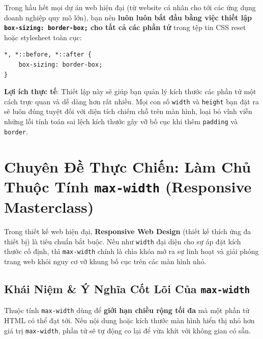 \documentclass[11pt,oneside]{book}
\newcommand{\codeinline}[1]{\textcolor{accentOrange}{\texttt{#1}}}
\newcommand{\term}[1]{\textbf{\textcolor{primaryBlue}{#1}}}
\DeclareRobustCommand{\csshint}[1]{\texorpdfstring{\textcolor{accentOrange}{\textbf{\texttt{#1}}}}{#1}}
\begin{document}
\begin{tipBox}
Trong hầu hết mọi dự án web hiện đại (từ website cá nhân cho tới các ứng dụng doanh nghiệp quy mô lớn), bạn nên \textbf{luôn luôn bắt đầu bằng việc thiết lập \codeinline{box-sizing: border-box;} cho tất cả các phần tử} trong tệp tin CSS reset hoặc stylesheet toàn cục:

\begin{lstlisting}[language=CSS3]
*, *::before, *::after {
    box-sizing: border-box;
}
\end{lstlisting}

\textbf{Lợi ích thực tế}: Thiết lập này sẽ giúp bạn quản lý kích thước các phần tử một cách trực quan và dễ dàng hơn rất nhiều. Mọi con số \codeinline{width} và \codeinline{height} bạn đặt ra sẽ luôn đúng tuyệt đối với diện tích chiếm chỗ trên màn hình, loại bỏ vĩnh viễn những lỗi tính toán sai lệch kích thước gây vỡ bố cục khi thêm \codeinline{padding} và \codeinline{border}.
\end{tipBox}

\clearpage
\section{Chuyên Đề Thực Chiến: Làm Chủ Thuộc Tính \csshint{max-width} (Responsive Masterclass)}
\label{sec:max_width_masterclass}

Trong thiết kế web hiện đại, \term{Responsive Web Design} (thiết kế thích ứng đa thiết bị) là tiêu chuẩn bắt buộc. Nếu như \codeinline{width} đại diện cho sự áp đặt kích thước cố định, thì \codeinline{max-width} chính là chìa khóa mở ra sự linh hoạt và giải phóng trang web khỏi nguy cơ vỡ khung bố cục trên các màn hình nhỏ.

\subsection{Khái Niệm \& Ý Nghĩa Cốt Lõi Của \csshint{max-width}}
\label{subsec:max_width_concept}

Thuộc tính \codeinline{max-width} dùng để \textbf{giới hạn chiều rộng tối đa} mà một phần tử HTML có thể đạt tới. Nếu nội dung hoặc kích thước màn hình hiển thị nhỏ hơn giá trị \codeinline{max-width}, phần tử sẽ tự động co lại để vừa khít với không gian có sẵn.
\end{document}
